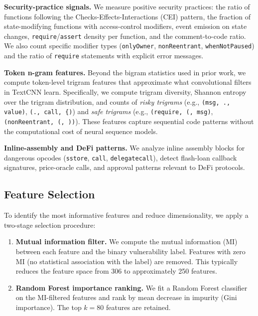 \documentclass[11pt,a4paper]{article}
\begin{document}
\textbf{Security-practice signals.}
We measure positive security practices: the ratio of functions following the Checks-Effects-Interactions (CEI) pattern, the fraction of state-modifying functions with access-control modifiers, event emission on state changes, \texttt{require}/\texttt{assert} density per function, and the comment-to-code ratio.
We also count specific modifier types (\texttt{onlyOwner}, \texttt{nonReentrant}, \texttt{whenNotPaused}) and the ratio of \texttt{require} statements with explicit error messages.

\textbf{Token n-gram features.}
Beyond the bigram statistics used in prior work, we compute token-level trigram features that approximate what convolutional filters in TextCNN learn.
Specifically, we compute trigram diversity, Shannon entropy over the trigram distribution, and counts of \emph{risky trigrams} (e.g., \texttt{(msg, ., value)}, \texttt{(., call, \{)}) and \emph{safe trigrams} (e.g., \texttt{(require, (, msg)}, \texttt{(nonReentrant, (, ))}).
These features capture sequential code patterns without the computational cost of neural sequence models.

\textbf{Inline-assembly and DeFi patterns.}
We analyze inline assembly blocks for dangerous opcodes (\texttt{sstore}, \texttt{call}, \texttt{delegatecall}), detect flash-loan callback signatures, price-oracle calls, and approval patterns relevant to DeFi protocols.

\subsection{Feature Selection}
\label{sec:feature_selection}

To identify the most informative features and reduce dimensionality, we apply a two-stage selection procedure:

\begin{enumerate}
    \item \textbf{Mutual information filter.} We compute the mutual information (MI) between each feature and the binary vulnerability label.  Features with zero MI (no statistical association with the label) are removed.  This typically reduces the feature space from 306 to approximately 250 features.
    
    \item \textbf{Random Forest importance ranking.} We fit a Random Forest classifier on the MI-filtered features and rank by mean decrease in impurity (Gini importance).  The top $k = 80$ features are retained.
\end{enumerate}
\end{document}
